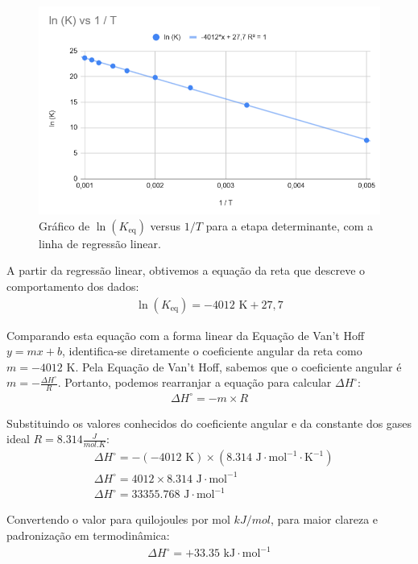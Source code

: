\begin{figure}[H]
\centering
\includegraphics[width=0.7\linewidth]{fig/regressao.png}
\caption{Gráfico de \(\ln(K_\text{eq})\) versus \(1/T\) para a etapa determinante, com a linha de regressão linear.}\label{fig:vant}
\end{figure}

A partir da regressão linear, obtivemos a equação da reta que descreve o comportamento dos dados:
\begin{align*}
\ln(K_\text{eq}) = -4012 \text{ K} + 27,7
\end{align*}

Comparando esta equação com a forma linear da Equação de Van't Hoff \(y = mx + b\), identifica-se diretamente o coeficiente angular da reta como \(m = -4012 \text{ K}\). Pela Equação de Van't Hoff, sabemos que o coeficiente angular é \(m = -\frac{\Delta H^\circ}{R}\). Portanto, podemos rearranjar a equação para calcular \(\Delta H^\circ\):
\begin{align*}
    \Delta H^\circ = -m \times R
\end{align*}

Substituindo os valores conhecidos do coeficiente angular e da constante dos gases ideal \(R = 8.314 \frac{J}{mol.K}\):
\begin{align*}
& \Delta H^\circ = -(-4012 \text{ K}) \times (8.314 \text{ J} \cdot \text{mol}^{-1} \cdot \text{K}^{-1}) \\
& \Delta H^\circ = 4012 \times 8.314 \text{ J} \cdot \text{mol}^{-1} \\
& \Delta H^\circ = 33355.768 \text{ J} \cdot \text{mol}^{-1}
\end{align*}

Convertendo o valor para quilojoules por mol \(kJ/mol\), para maior clareza e padronização em termodinâmica:
\begin{align*}
    \Delta H^\circ = +33.35 \text{ kJ} \cdot \text{mol}^{-1}
\end{align*}

